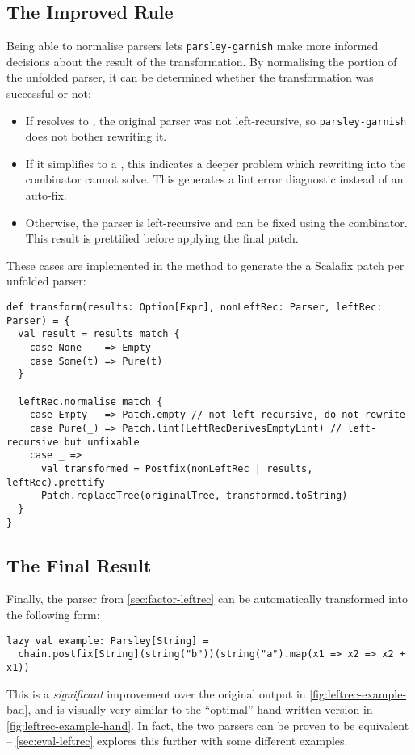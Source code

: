 \documentclass[../../main.tex]{subfiles}
\begin{document}
\subsection{The Improved Rule}
Being able to normalise parsers lets \texttt{parsley-garnish} make more informed decisions about the result of the transformation.
By normalising the  portion of the unfolded parser, it can be determined whether the transformation was successful or not:
\begin{itemize}
  \item If  resolves to , the original parser was not left-recursive, so \texttt{parsley-garnish} does not bother rewriting it.
  \item If it simplifies to a , this indicates a deeper problem which rewriting into the  combinator cannot solve. This generates a lint error diagnostic instead of an auto-fix.
  \item Otherwise, the parser is left-recursive and can be fixed using the  combinator. This result is prettified before applying the final patch.
\end{itemize}
%
These cases are implemented in the  method to generate the a Scalafix patch per unfolded parser:
\begin{verbatim}
def transform(results: Option[Expr], nonLeftRec: Parser, leftRec: Parser) = {
  val result = results match {
    case None    => Empty
    case Some(t) => Pure(t)
  }

  leftRec.normalise match {
    case Empty   => Patch.empty // not left-recursive, do not rewrite
    case Pure(_) => Patch.lint(LeftRecDerivesEmptyLint) // left-recursive but unfixable
    case _ =>
      val transformed = Postfix(nonLeftRec | results, leftRec).prettify
      Patch.replaceTree(originalTree, transformed.toString)
  }
}
\end{verbatim}

\subsection*{The Final Result}
Finally, the  parser from \cref{sec:factor-leftrec} can be automatically transformed into the following form:
\begin{verbatim}
lazy val example: Parsley[String] =
  chain.postfix[String](string("b"))(string("a").map(x1 => x2 => x2 + x1))
\end{verbatim}
%
This is a \emph{significant} improvement over the original output in \cref{fig:leftrec-example-bad}, and is visually very similar to the ``optimal'' hand-written version in \cref{fig:leftrec-example-hand}.
In fact, the two parsers can be proven to be equivalent -- \cref{sec:eval-leftrec} explores this further with some different examples.
\end{document}
